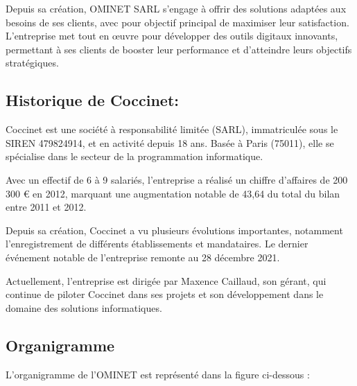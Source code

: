 Depuis sa création, OMINET SARL s'engage à offrir des solutions adaptées aux besoins de ses clients, avec pour objectif principal de maximiser leur satisfaction. L’entreprise met tout en œuvre pour développer des outils digitaux innovants, permettant à ses clients de booster leur performance et d’atteindre leurs objectifs stratégiques.


\subsection{Historique de Coccinet:}
Coccinet est une société à responsabilité limitée (SARL), immatriculée sous le SIREN 479824914, et en activité depuis 18 ans. Basée à Paris (75011), elle se spécialise dans le secteur de la programmation informatique.

Avec un effectif de 6 à 9 salariés, l’entreprise a réalisé un chiffre d'affaires de 200 300 € en 2012, marquant une augmentation notable de 43,64 du total du bilan entre 2011 et 2012.

Depuis sa création, Coccinet a vu plusieurs évolutions importantes, notamment l’enregistrement de différents établissements et mandataires. Le dernier événement notable de l’entreprise remonte au 28 décembre 2021.

Actuellement, l’entreprise est dirigée par Maxence Caillaud, son gérant, qui continue de piloter Coccinet dans ses projets et son développement dans le domaine des solutions informatiques.

\subsection{Organigramme}
L'organigramme de l'OMINET est représenté dans la figure ci-dessous :

